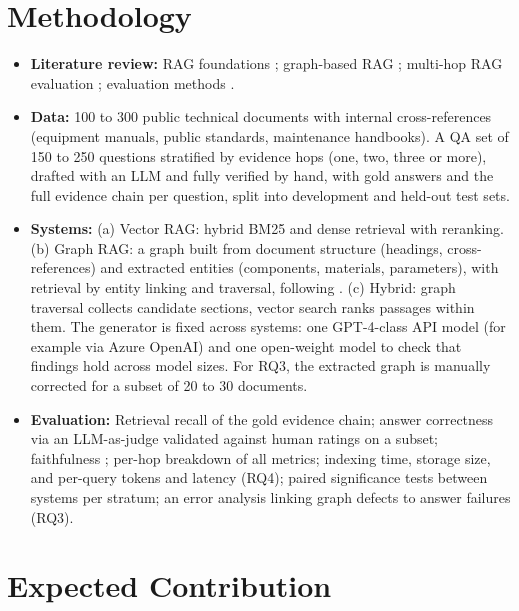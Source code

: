 \documentclass[10pt,a4paper]{article}
\begin{document}
\section{Methodology}

\begin{itemize}
    \item \textbf{Literature review:} RAG foundations \cite{lewis2020rag}; graph-based RAG \cite{documentgraphrag2025, edge2024graphrag}; multi-hop RAG evaluation \cite{tang2024}; evaluation methods \cite{es2024ragas}.
    \item \textbf{Data:} 100 to 300 public technical documents with internal cross-references (equipment manuals, public standards, maintenance handbooks). A QA set of 150 to 250 questions stratified by evidence hops (one, two, three or more), drafted with an LLM and fully verified by hand, with gold answers and the full evidence chain per question, split into development and held-out test sets.
    \item \textbf{Systems:} (a) Vector RAG: hybrid BM25 and dense retrieval with reranking. (b) Graph RAG: a graph built from document structure (headings, cross-references) and extracted entities (components, materials, parameters), with retrieval by entity linking and traversal, following \cite{documentgraphrag2025, edge2024graphrag}. (c) Hybrid: graph traversal collects candidate sections, vector search ranks passages within them. The generator is fixed across systems: one GPT-4-class API model (for example via Azure OpenAI) and one open-weight model to check that findings hold across model sizes. For RQ3, the extracted graph is manually corrected for a subset of 20 to 30 documents.
    \item \textbf{Evaluation:} Retrieval recall of the gold evidence chain; answer correctness via an LLM-as-judge validated against human ratings on a subset; faithfulness \cite{es2024ragas}; per-hop breakdown of all metrics; indexing time, storage size, and per-query tokens and latency (RQ4); paired significance tests between systems per stratum; an error analysis linking graph defects to answer failures (RQ3).
\end{itemize}

\section{Expected Contribution}
\end{document}

